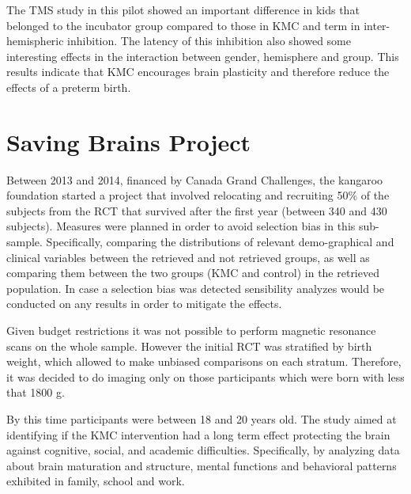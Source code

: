 The TMS study in this pilot showed an important difference in kids that belonged to the incubator group compared to those in KMC and term \autocite{schneider_cerebral_2012} in inter-hemispheric inhibition. The latency of this inhibition also showed some interesting effects in the interaction between gender, hemisphere and group. This results indicate that KMC encourages brain plasticity and therefore reduce the effects of a preterm birth. 


\section{Saving Brains Project}





Between 2013 and 2014, financed by Canada Grand Challenges, the kangaroo foundation started a project that involved relocating and recruiting 50\% of the subjects from the RCT that survived after the first year (between 340 and 430 subjects). Measures were planned in order to avoid selection bias in this sub-sample. Specifically, comparing the distributions of relevant demo-graphical and clinical variables between the retrieved and not retrieved groups, as well as comparing them between the two groups (KMC and control) in the retrieved population. In case a selection bias was detected sensibility analyzes would be conducted on any results in order to mitigate the effects. 

Given budget restrictions it was not possible to perform magnetic resonance scans on the whole sample. However the initial RCT was stratified by birth weight, which allowed to make unbiased comparisons on each stratum. Therefore, it was decided to do imaging only on those participants which were born with less that 1800 g. 

By this time participants were between 18 and 20 years old. The study aimed at identifying if the KMC intervention had a long term effect protecting the brain against cognitive, social, and academic difficulties. Specifically, by analyzing data about brain maturation and structure, mental functions and behavioral patterns exhibited in family, school and work. 

